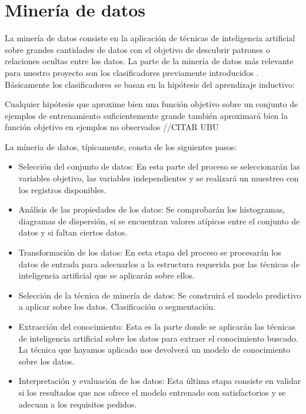 \section{Minería de datos}

La minería de datos consiste en la aplicación de técnicas de inteligencia artificial sobre grandes cantidades de datos con el objetivo de descubrir patrones o relaciones ocultas entre los datos. La parte de la minería de datos más relevante para nuestro proyecto son los clasificadores previamente introducidos \cite{procesosMineriaDatos}. Básicamente los clasificadores se basan en la hipótesis del aprendizaje inductivo:

Cualquier hipótesis que aproxime bien una función objetivo sobre un conjunto de ejemplos de entrenamiento suficientemente grande también aproximará bien la función objetivo en ejemplos no observados //CITAR UBU

La míneria de datos, típicamente, consta de los siguientes pasos:
\begin{itemize}
	\item{Selección del conjunto de datos}: En esta parte del proceso se seleccionarán las variables objetivo, las variables independientes y se realizará un muestreo con los registros disponibles.
	\item{Análisis de las propiedades de los datos}: Se comprobarán los histogramas, diagramas de dispersión, si se encuentran valores atípicos entre el conjunto de datos y si faltan ciertos datos.
	\item{Transformación de los datos}: En esta etapa del proceso se procesarán los datos de entrada para adecuarlos a la estructura requerida por las técnicas de inteligencia artificial que se aplicarán sobre ellos.
	\item{Selección de la técnica de minería de datos}: Se construirá el modelo predictivo a aplicar sobre los datos. Clasificación o segmentación.
	\item{Extracción del conocimiento}: Esta es la parte donde se aplicarán las técnicas de inteligencia artificial sobre los datos para extraer el conocimiento buscado. La técnica que hayamos aplicado nos devolverá un modelo de conocimiento sobre los datos.
	\item{Interpretación y evaluación de los datos}: Esta última etapa consiste en validar si los resultados que nos ofrece el modelo entrenado son satisfactorios y se adecuan a los requisitos pedidos.
\end{itemize}


